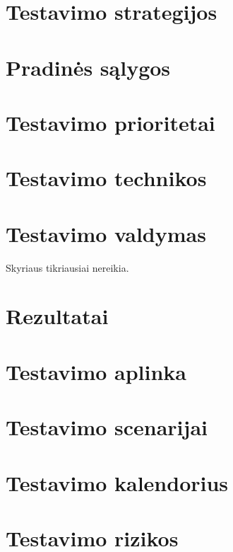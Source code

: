 \documentclass[12pt]{article}
\begin{document}
\section{Testavimo strategijos}

\section{Pradinės sąlygos}

\section{Testavimo prioritetai}

\section{Testavimo technikos}

\section{Testavimo valdymas}
Skyriaus tikriausiai nereikia.

\section{Rezultatai}

\section{Testavimo aplinka}

\section{Testavimo scenarijai}

\section{Testavimo kalendorius}

\section{Testavimo rizikos}


\end{document}

